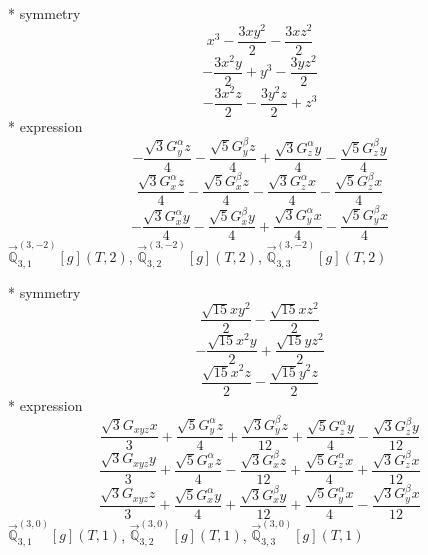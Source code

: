 \documentclass[fleqn,8pt]{jsarticle}
\begin{document}
\noindent\quad ** symmetry
\begin{dmath*}
x^{3} - \frac{3 x y^{2}}{2} - \frac{3 x z^{2}}{2}
\end{dmath*}
\begin{dmath*}
- \frac{3 x^{2} y}{2} + y^{3} - \frac{3 y z^{2}}{2}
\end{dmath*}
\begin{dmath*}
- \frac{3 x^{2} z}{2} - \frac{3 y^{2} z}{2} + z^{3}
\end{dmath*}
\noindent\quad ** expression
\begin{dmath*}
- \frac{\sqrt{3} G_{y}^{\alpha} z}{4} - \frac{\sqrt{5} G_{y}^{\beta} z}{4} + \frac{\sqrt{3} G_{z}^{\alpha} y}{4} - \frac{\sqrt{5} G_{z}^{\beta} y}{4}
\end{dmath*}
\begin{dmath*}
\frac{\sqrt{3} G_{x}^{\alpha} z}{4} - \frac{\sqrt{5} G_{x}^{\beta} z}{4} - \frac{\sqrt{3} G_{z}^{\alpha} x}{4} - \frac{\sqrt{5} G_{z}^{\beta} x}{4}
\end{dmath*}
\begin{dmath*}
- \frac{\sqrt{3} G_{x}^{\alpha} y}{4} - \frac{\sqrt{5} G_{x}^{\beta} y}{4} + \frac{\sqrt{3} G_{y}^{\alpha} x}{4} - \frac{\sqrt{5} G_{y}^{\beta} x}{4}
\end{dmath*}
\noindent\quad $\vec{\mathbb{Q}}_{3,1}^{(3,-2)}[g](T,2)$, $\vec{\mathbb{Q}}_{3,2}^{(3,-2)}[g](T,2)$, $\vec{\mathbb{Q}}_{3,3}^{(3,-2)}[g](T,2)$

\noindent\quad ** symmetry
\begin{dmath*}
\frac{\sqrt{15} x y^{2}}{2} - \frac{\sqrt{15} x z^{2}}{2}
\end{dmath*}
\begin{dmath*}
- \frac{\sqrt{15} x^{2} y}{2} + \frac{\sqrt{15} y z^{2}}{2}
\end{dmath*}
\begin{dmath*}
\frac{\sqrt{15} x^{2} z}{2} - \frac{\sqrt{15} y^{2} z}{2}
\end{dmath*}
\noindent\quad ** expression
\begin{dmath*}
\frac{\sqrt{3} G_{xyz} x}{3} + \frac{\sqrt{5} G_{y}^{\alpha} z}{4} + \frac{\sqrt{3} G_{y}^{\beta} z}{12} + \frac{\sqrt{5} G_{z}^{\alpha} y}{4} - \frac{\sqrt{3} G_{z}^{\beta} y}{12}
\end{dmath*}
\begin{dmath*}
\frac{\sqrt{3} G_{xyz} y}{3} + \frac{\sqrt{5} G_{x}^{\alpha} z}{4} - \frac{\sqrt{3} G_{x}^{\beta} z}{12} + \frac{\sqrt{5} G_{z}^{\alpha} x}{4} + \frac{\sqrt{3} G_{z}^{\beta} x}{12}
\end{dmath*}
\begin{dmath*}
\frac{\sqrt{3} G_{xyz} z}{3} + \frac{\sqrt{5} G_{x}^{\alpha} y}{4} + \frac{\sqrt{3} G_{x}^{\beta} y}{12} + \frac{\sqrt{5} G_{y}^{\alpha} x}{4} - \frac{\sqrt{3} G_{y}^{\beta} x}{12}
\end{dmath*}
\noindent\quad $\vec{\mathbb{Q}}_{3,1}^{(3,0)}[g](T,1)$, $\vec{\mathbb{Q}}_{3,2}^{(3,0)}[g](T,1)$, $\vec{\mathbb{Q}}_{3,3}^{(3,0)}[g](T,1)$
\end{document}

